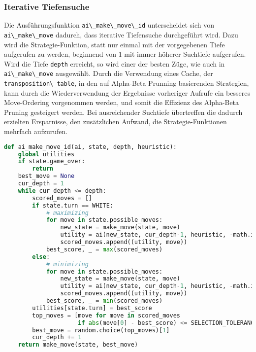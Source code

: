 \hypertarget{iterative-tiefensuche}{%
\subsubsection{Iterative Tiefensuche}\label{iterative-tiefensuche}}

Die Ausführungsfunktion \passthrough{\lstinline!ai\_make\_move\_id!}
unterscheidet sich von \passthrough{\lstinline!ai\_make\_move!} dadurch,
dass iterative Tiefensuche durchgeführt wird. Dazu wird die
Strategie-Funktion, statt nur einmal mit der vorgegebenen Tiefe
aufgerufen zu werden, beginnend von 1 mit immer höherer Suchtiefe
aufgerufen. Wird die Tiefe \passthrough{\lstinline!depth!} erreicht, so
wird einer der besten Züge, wie auch in
\passthrough{\lstinline!ai\_make\_move!} ausgewählt. Durch die
Verwendung eines Cache, der
\passthrough{\lstinline!transposition\_table!}, in den auf Alpha-Beta
Prunning basierenden Strategien, kann durch die Wiederverwendung der
Ergebnisse vorheriger Aufrufe ein besseres Move-Ordering vorgenommen
werden, und somit die Effizienz des Alpha-Beta Pruning gesteigert
werden. Bei ausreichender Suchtiefe übertreffen die dadurch erzielten
Ersparnisse, den zusätzlichen Aufwand, die Strategie-Funktionen mehrfach
aufzurufen.

\begin{lstlisting}[language=Python]
def ai_make_move_id(ai, state, depth, heuristic):
    global utilities
    if state.game_over:
        return
    best_move = None
    cur_depth = 1
    while cur_depth <= depth:
        scored_moves = []
        if state.turn == WHITE:
            # maximizing
            for move in state.possible_moves:
                new_state = make_move(state, move)
                utility = ai(new_state, cur_depth-1, heuristic, -math.inf, math.inf)
                scored_moves.append((utility, move))
            best_score, _ = max(scored_moves)
        else:
            # minimizing
            for move in state.possible_moves:
                new_state = make_move(state, move)
                utility = ai(new_state, cur_depth-1, heuristic, -math.inf, math.inf)
                scored_moves.append((utility, move))
            best_score, _ = min(scored_moves)
        utilities[state.turn] = best_score
        top_moves = [move for move in scored_moves
                     if abs(move[0] - best_score) <= SELECTION_TOLERANCE]
        best_move = random.choice(top_moves)[1]
        cur_depth += 1
    return make_move(state, best_move)
\end{lstlisting}

